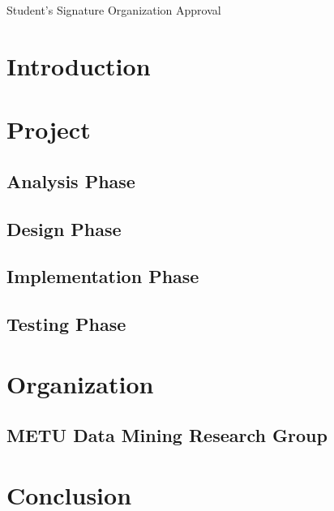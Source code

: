 \documentclass[12pt]{article}
\begin{document}
\begin{titlepage}
Student's Signature \hspace{150px} Organization Approval \\


\end{titlepage}


\tableofcontents          
\newpage

\section{Introduction}

\section{Project}
\subsection{Analysis Phase}
\subsection{Design Phase}
\subsection{Implementation Phase}
\subsection{Testing Phase}

\section{Organization}
\subsection{METU Data Mining Research Group}

\section{Conclusion}



\end{document}
